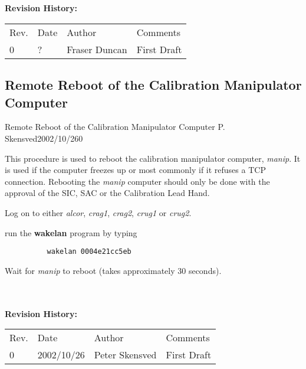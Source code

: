 {\small
~\\
~\\
\noindent
{\bf Revision History:}\\
\begin{tabular}{llll}
Rev. & Date & Author & Comments\\

0             & 
?    & 
Fraser Duncan &
\parbox[t]{3.0in}{
  First Draft
}
\end{tabular}
}



\newpage
\subsection{Remote Reboot of the Calibration Manipulator Computer}

             {Remote Reboot of the Calibration Manipulator Computer}
             {P. Skensved}{2002/10/26}{0}


  This procedure is used to reboot the calibration manipulator computer,
{\em manip}.  It is used if the computer freezes up or most commonly
if it refuses a TCP connection.  Rebooting the {\em manip} computer
should only be done with the approval of the SIC, SAC or the Calibration
Lead Hand.

\begin{enumerate}
\checkitem Log on to either {\em alcor}, {\em crag1}, {\em crag2},
  {\em crug1} or  {\em crug2}.

\checkitem run the {\bf wakelan} program by typing
  \begin{verbatim}
          wakelan 0004e21cc5eb
  \end{verbatim}

\checkitem Wait for {\em manip} to reboot (takes approximately 30 seconds).
  
\end{enumerate}


{\small
~\\
~\\
\noindent
{\bf Revision History:}\\
\begin{tabular}{llll}
Rev. & Date & Author & Comments\\
0           & 
2002/10/26  & 
Peter Skensved &
\parbox[t]{3.0in}{
  First Draft
}\\
\end{tabular}
}






